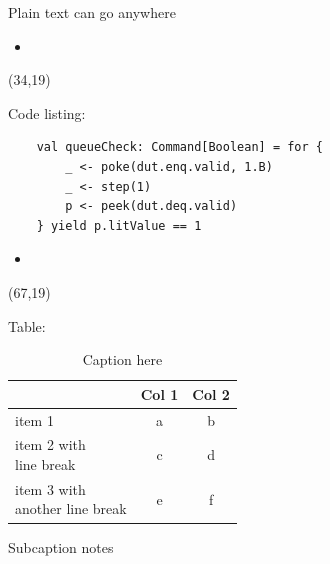 \documentclass[final]{beamer}
\begin{document}
\begin{frame}{}
\begin{textblock}{32}
    Plain text can go anywhere

    \begin{itemize}
      \item \kant[1]
    \end{itemize}
  \end{textblock}

  \begin{textblock}{32}(34,19)
    \vspace{0.5cm}

    Code listing:

    \begin{verbatim}
    val queueCheck: Command[Boolean] = for {
        _ <- poke(dut.enq.valid, 1.B)
        _ <- step(1)
        p <- peek(dut.deq.valid)
    } yield p.litValue == 1
    \end{verbatim}

    \vspace{0.5cm}
    \vspace{0.5cm}

    \begin{itemize}
      \item \kant[2]
    \end{itemize}
  \end{textblock}

  \begin{textblock}{31}(67,19)
    \vspace{0.5cm}

    Table:

    \begin{center}
    \begin{table}[b]
      \small
      \begin{tabular}{lcc}
        \toprule
        & Col 1 & Col 2 \\ \midrule
        item 1 & a & b \\ \midrule
        \makecell[l]{item 2 with \\ line break} & c & d \\ \midrule
        \makecell[l]{item 3 with \\ another line break} & e & f \\
        \bottomrule
      \end{tabular}
      \caption*{Caption here}
      {\footnotesize Subcaption notes}
      \label{tab}
    \end{table}
    \end{center}


\end{textblock}
\end{frame}
\end{document}
